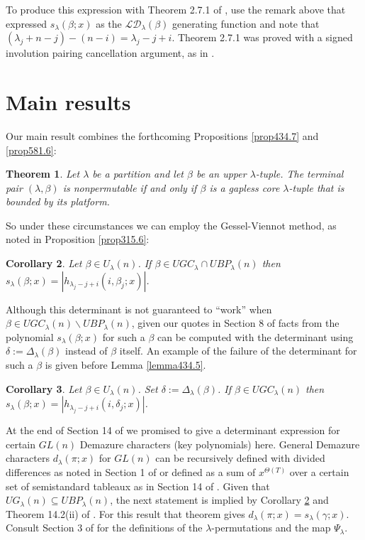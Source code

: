 \documentclass[11pt]{article}
\newtheorem{thm}{Theorem}[section]
\newtheorem{cor}[thm]{Corollary}
\theoremstyle{definition}
\theoremstyle{remark}
\numberwithin{equation}{section}
\begin{document}
\begin{spacing}{1.35}
\noindent To produce this expression with Theorem 2.7.1 of \cite{St1}, use the remark above that expressed $s_\lambda(\beta;x)$ as the $\mathcal{LD}_\lambda(\beta)$ generating function and note that $(\lambda_j+n-j)-(n-i) = \lambda_j-j+i$.  Theorem 2.7.1 was proved with a signed involution pairing cancellation argument, as in \cite{GV}.





\section{Main results}

Our main result combines the forthcoming Propositions \ref{prop434.7} and \ref{prop581.6}:

\begin{thm}\label{theorem777.1}Let $\lambda$ be a partition and let $\beta$ be an upper $\lambda$-tuple.  The terminal pair $(\lambda, \beta)$ is nonpermutable if and only if $\beta$ is a gapless core $\lambda$-tuple that is bounded by its platform. \end{thm}

\noindent So under these circumstances we can employ the Gessel-Viennot method, as noted in Proposition \ref{prop315.6}:

\begin{cor}\label{cor777.2}Let $\beta \in U_\lambda(n)$.  If $\beta \in UGC_\lambda \cap UBP_\lambda(n)$ then $s_\lambda(\beta;x) = | h_{\lambda_j-j+i}(i,\beta_j;x) |$. \end{cor}

\noindent Although this determinant is not guaranteed to ``work'' when $\beta \in UGC_\lambda(n) \backslash UBP_\lambda(n)$, given our quotes in Section 8 of facts from \cite{PW} the polynomial $s_\lambda(\beta;x)$ for such a $\beta$ can be computed with the determinant using $\delta := \Delta_\lambda(\beta)$ instead of $\beta$ itself.  An example of the failure of the determinant for such a $\beta$ is given before Lemma \ref{lemma434.5}.

\begin{cor}\label{cor777.2.5}Let $\beta \in U_\lambda(n)$.  Set $\delta := \Delta_\lambda(\beta)$.  If $\beta \in UGC_\lambda(n)$ then $s_\lambda(\beta;x) = | h_{\lambda_j-j+i}(i,\delta_j;x) |$. \end{cor}


At the end of Section 14 of \cite{PW} we promised to give a determinant expression for certain $GL(n)$ Demazure characters (key polynomials) here.  General Demazure characters $d_\lambda(\pi;x)$ for $GL(n)$ can be recursively defined with divided differences as noted in Section 1 of \cite{PW} or defined as a sum of $x^{\Theta(T)}$ over a certain set of semistandard tableaux as in Section 14 of \cite{PW}.  Given that $UG_\lambda(n) \subseteq UBP_\lambda(n)$, the next statement is implied by Corollary \ref{cor777.2} and Theorem 14.2(ii) of \cite{PW}.  For this result that theorem gives $d_\lambda(\pi;x) = s_\lambda(\gamma;x)$.  Consult Section 3 of \cite{PW} for the definitions of the $\lambda$-permutations and the map $\Psi_\lambda$.


\end{spacing}
\end{document}

